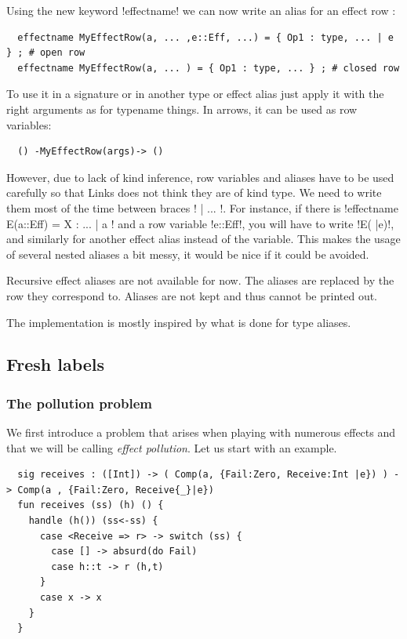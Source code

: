\documentclass[11pt, nonacm=true, language=french, language=english]{acmart}
\begin{document}
Using the new keyword !effectname! we can now write an alias for an effect row :
\begin{lstlisting}
  effectname MyEffectRow(a, ... ,e::Eff, ...) = { Op1 : type, ... | e } ; # open row
  effectname MyEffectRow(a, ... ) = { Op1 : type, ... } ; # closed row
\end{lstlisting}

To use it in a signature or in another type or effect alias just apply it with the right arguments as for typename things. In arrows, it can be used as row variables:
\begin{lstlisting}
  () -MyEffectRow(args)-> ()
\end{lstlisting}

However, due to lack of kind inference, row variables and aliases have to be used carefully so that Links does not think they are of kind type. We need to write them most of the time between braces !{ | ... }!. For instance, if there is !effectname E(a::Eff) = {X : ... | a }! and a row variable !e::Eff!, you will have to write !E({ |e})!, and similarly for another effect alias instead of the variable. This makes the usage of several nested aliases a bit messy, it would be nice if it could be avoided.

Recursive effect aliases are not available for now. The aliases are replaced by the row they correspond to. Aliases are not kept and thus cannot be printed out.

The implementation is mostly inspired by what is done for type aliases.

\subsection{Fresh labels}
\label{sec:fresh-labels}

\subsubsection{The pollution problem}
\label{sec:pollution-problem}

We first introduce a problem that arises when playing with numerous effects and that we will be calling \emph{effect pollution}. Let us start with an example.

\begin{lstlisting}
  sig receives : ([Int]) -> ( Comp(a, {Fail:Zero, Receive:Int |e}) ) -> Comp(a , {Fail:Zero, Receive{_}|e})
  fun receives (ss) (h) () {
    handle (h()) (ss<-ss) {
      case <Receive => r> -> switch (ss) {
        case [] -> absurd(do Fail)
        case h::t -> r (h,t)
      }
      case x -> x
    }
  }
\end{lstlisting}
\end{document}
